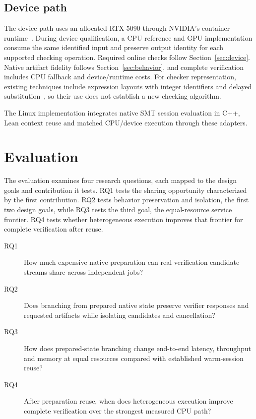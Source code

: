 \documentclass[10pt,twocolumn]{article}
\begin{document}
\subsection{Device path}
The device path uses an allocated RTX 5090 through NVIDIA's container runtime~\cite{nvidiaContainerToolkit}. During device qualification, a CPU reference and GPU implementation consume the same identified input and preserve output identity for each supported checking operation. Required online checks follow Section~\ref{sec:device}. Native artifact fidelity follows Section~\ref{sec:behavior}, and complete verification includes CPU fallback and device/runtime costs. For checker representation, existing techniques include expression layouts with integer identifiers and delayed substitution~\cite{nanoclo,nanocloFortran}, so their use does not establish a new checking algorithm.

The Linux implementation integrates native SMT session evaluation in C++, Lean context reuse and matched CPU/device execution through these adapters.

\section{Evaluation}\label{sec:evaluation}
The evaluation examines four research questions, each mapped to the design goals and contribution it tests. RQ1 tests the sharing opportunity characterized by the first contribution. RQ2 tests behavior preservation and isolation, the first two design goals, while RQ3 tests the third goal, the equal-resource service frontier. RQ4 tests whether heterogeneous execution improves that frontier for complete verification after reuse.
\begin{description}
\item[RQ1] How much expensive native preparation can real verification candidate streams share across independent jobs?
\item[RQ2] Does branching from prepared native state preserve verifier responses and requested artifacts while isolating candidates and cancellation?
\item[RQ3] How does prepared-state branching change end-to-end latency, throughput and memory at equal resources compared with established warm-session reuse?
\item[RQ4] After preparation reuse, when does heterogeneous execution improve complete verification over the strongest measured CPU path?
\end{description}
\end{document}
